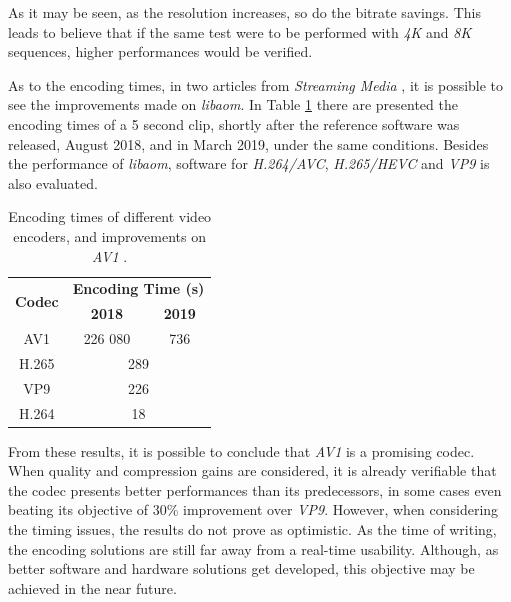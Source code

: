 As it may be seen, as the resolution increases, so do the bitrate savings. This leads to believe that if the same test were to be performed with \emph{4K} and \emph{8K} sequences, higher performances would be verified.

\FloatBarrier 

As to the encoding times, in two articles from \emph{Streaming Media} \cite{AV1FirstLook2018, GoodNewsAV12019}, it is possible to see the improvements made on \emph{libaom}. In Table \ref{tab:testtime} there are presented the encoding times of a 5 second clip, shortly after the reference software was released, August 2018, and in March 2019, under the same conditions. Besides the performance of \emph{libaom}, software for \emph{H.264/AVC}, \emph{H.265/HEVC} and \emph{VP9} is also evaluated.

\begin{table}[!htpb]
    \centering
    \caption[Encoding times of different video encoders, and improvements on \emph{AV1}]{Encoding times of different video encoders, and improvements on \emph{AV1} \cite{AV1FirstLook2018, GoodNewsAV12019}.}
    \begin{tabular}{ccc} \toprule
        \multirow{2}{*}{\textbf{Codec}}     &      \multicolumn{2}{c}{\textbf{Encoding Time (s)}} \\
         &    \textbf{2018}  &   \textbf{2019}  \\ \toprule
        AV1            &    226 080        & 736 \\ \hline
        H.265          &    \multicolumn{2}{c}{289} \\ \hline
        VP9            &    \multicolumn{2}{c}{226} \\ \hline
        H.264          &    \multicolumn{2}{c}{18} \\
        \bottomrule
    \end{tabular}    
    \label{tab:testtime}
\end{table}

From these results, it is possible to conclude that \emph{AV1} is a promising codec. When quality and compression gains are considered, it is already verifiable that the codec presents better performances than its predecessors, in some cases even beating its objective of 30\% improvement over \emph{VP9}. However, when considering the timing issues, the results do not prove as optimistic. As the time of writing, the encoding solutions are still far away from a real-time usability. Although, as better software and hardware solutions get developed, this objective may be achieved in the near future.


\clearpage
\printbibliography[heading=subbibliography]
